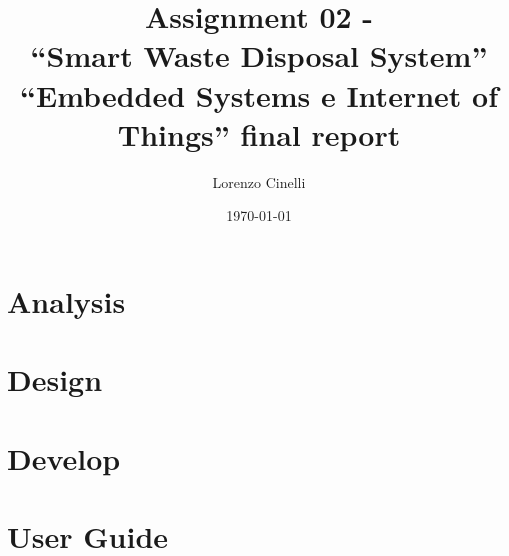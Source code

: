 \documentclass[a4paper,12pt]{report}
\title{Assignment 02 - \\``Smart Waste Disposal System''\\
    \large ``Embedded Systems e Internet of Things'' final report}
\author{Lorenzo Cinelli}
\date{\today}
\begin{document}
\maketitle

\tableofcontents

\chapter{Analysis}

\chapter{Design}

\chapter{Develop}

\appendix
\chapter{User Guide}
\end{document}
